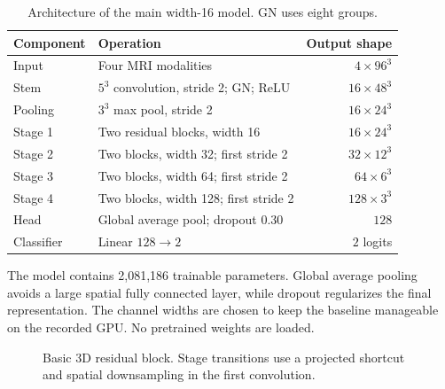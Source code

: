 \documentclass[12pt,a4paper,oneside]{report}
\begin{document}
\begin{table}[H]
\centering
\caption{Architecture of the main width-16 model. GN uses eight groups.}
\label{tab:architecture}
\small
\begin{tabularx}{\linewidth}{lYr}
\toprule
Component & Operation & Output shape\\\midrule
Input & Four MRI modalities & $4\times96^3$\\
Stem & $5^3$ convolution, stride 2; GN; ReLU & $16\times48^3$\\
Pooling & $3^3$ max pool, stride 2 & $16\times24^3$\\
Stage 1 & Two residual blocks, width 16 & $16\times24^3$\\
Stage 2 & Two blocks, width 32; first stride 2 & $32\times12^3$\\
Stage 3 & Two blocks, width 64; first stride 2 & $64\times6^3$\\
Stage 4 & Two blocks, width 128; first stride 2 & $128\times3^3$\\
Head & Global average pool; dropout 0.30 & $128$\\
Classifier & Linear $128\rightarrow2$ & $2$ logits\\\bottomrule
\end{tabularx}
\end{table}

The model contains 2,081,186 trainable parameters. Global average pooling avoids a large spatial fully connected layer, while dropout regularizes the final representation. The channel widths are chosen to keep the baseline manageable on the recorded GPU. No pretrained weights are loaded.

\begin{figure}[H]
\centering
{}
\caption[Basic 3D residual block]{Basic 3D residual block. Stage transitions use a projected shortcut and spatial downsampling in the first convolution.}
\label{fig:block}
\end{figure}
\end{document}
